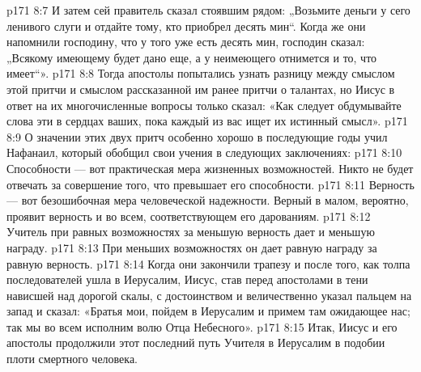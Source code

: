 \vs p171 8:7 И затем сей правитель сказал стоявшим рядом: „Возьмите деньги у сего ленивого слуги и отдайте тому, кто приобрел десять мин“. Когда же они напомнили господину, что у того уже есть десять мин, господин сказал: „Всякому имеющему будет дано еще, а у неимеющего отнимется и то, что имеет“».
\vs p171 8:8 \pc Тогда апостолы попытались узнать разницу между смыслом этой притчи и смыслом рассказанной им ранее притчи о талантах, но Иисус в ответ на их многочисленные вопросы только сказал: «Как следует обдумывайте слова эти в сердцах ваших, пока каждый из вас ищет их истинный смысл».
\vs p171 8:9 О значении этих двух притч особенно хорошо в последующие годы учил Нафанаил, который обобщил свои учения в следующих заключениях:
\vs p171 8:10 \bibnobreakspace Способности --- вот практическая мера жизненных возможностей. Никто не будет отвечать за совершение того, что превышает его способности.
\vs p171 8:11 \bibnobreakspace Верность --- вот безошибочная мера человеческой надежности. Верный в малом, вероятно, проявит верность и во всем, соответствующем его дарованиям.
\vs p171 8:12 \bibnobreakspace Учитель при равных возможностях за меньшую верность дает и меньшую награду.
\vs p171 8:13 \bibnobreakspace При меньших возможностях он дает равную награду за равную верность.
\vs p171 8:14 \pc Когда они закончили трапезу и после того, как толпа последователей ушла в Иерусалим, Иисус, став перед апостолами в тени нависшей над дорогой скалы, с достоинством и величественно указал пальцем на запад и сказал: «Братья мои, пойдем в Иерусалим и примем там ожидающее нас; так мы во всем исполним волю Отца Небесного».
\vs p171 8:15 Итак, Иисус и его апостолы продолжили этот последний путь Учителя в Иерусалим в подобии плоти смертного человека.
